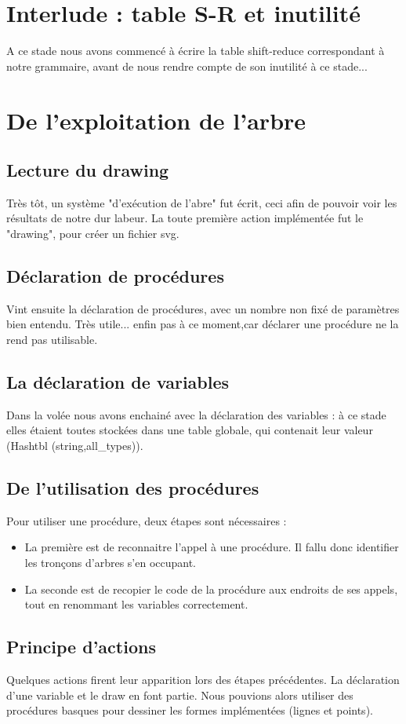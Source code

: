 \documentclass[11pt]{report} %
\begin{document}
\section{Interlude : table S-R et inutilité}
A ce stade nous avons commencé à écrire la table shift-reduce correspondant à notre grammaire, avant de nous rendre compte de son inutilité à ce stade...

\section{De l'exploitation de l'arbre}
\subsection{Lecture du drawing}%
Très tôt, un système "d'exécution de l'abre" fut écrit, ceci afin de pouvoir voir les résultats de notre dur labeur. La toute première action implémentée fut le "drawing", pour créer un fichier svg.
\subsection{Déclaration de procédures}
Vint ensuite la déclaration de procédures, avec un nombre non fixé de paramètres bien entendu. Très utile... enfin pas à ce moment,car déclarer une procédure ne la rend pas utilisable.
\subsection{La déclaration de variables} %
Dans la volée nous avons enchainé avec la déclaration des variables : à ce stade elles étaient toutes stockées dans une table globale, qui contenait leur valeur (Hashtbl (string,all\_types)).
\subsection{De l'utilisation des procédures}%
Pour utiliser une procédure, deux étapes sont nécessaires :
\begin{itemize}
\item La première est de reconnaitre l'appel à une procédure. Il fallu donc identifier les tronçons d'arbres s'en occupant.
\item La seconde est de recopier le code de la procédure aux endroits de ses appels, tout en renommant les variables correctement.
\end{itemize}
\subsection{Principe d'actions} %
Quelques actions firent leur apparition lors des étapes précédentes. La déclaration d'une variable et le draw en font partie. Nous pouvions alors utiliser des procédures basques pour dessiner les formes implémentées (lignes et points).
\end{document}
